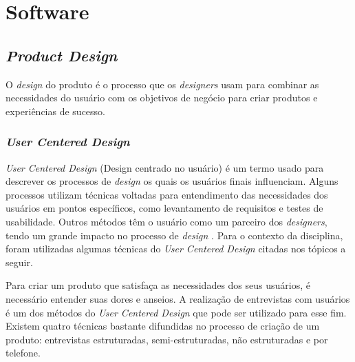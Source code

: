 \section{Software}

\subsection{\textit{Product Design}}

O \textit{design} do produto é o processo que os \textit{designers} usam para combinar as necessidades do usuário com os objetivos de negócio para criar produtos e experiências de sucesso. 

\subsubsection{\textit{User Centered Design}}
\textit{User Centered Design} (Design centrado no usuário) é um termo usado para descrever os processos de \textit{design} os quais os usuários finais influenciam. Alguns processos utilizam técnicas voltadas para entendimento das necessidades dos usuários em pontos específicos, como levantamento de requisitos e testes de usabilidade. Outros métodos têm o usuário como um parceiro dos \textit{designers}, tendo um grande impacto no processo de \textit{design} \cite{abras2004user}.
Para o contexto da disciplina, foram utilizadas algumas técnicas do \textit{User Centered Design} citadas nos tópicos a seguir.

Para criar um produto que satisfaça as necessidades dos seus usuários, é necessário entender suas dores e anseios. A realização de entrevistas com usuários é um dos métodos do \textit{User Centered Design} que pode ser utilizado para esse fim.
Existem quatro técnicas bastante difundidas no processo de criação de um produto: entrevistas estruturadas, semi-estruturadas, não estruturadas e por telefone. \cite{wilson2013interview}

